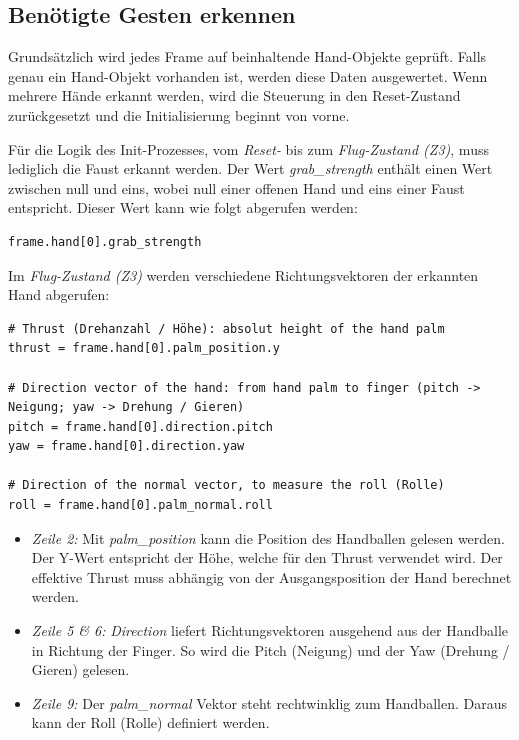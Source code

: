 \subsection{Benötigte Gesten erkennen}
Grundsätzlich wird jedes Frame auf beinhaltende Hand-Objekte geprüft.
Falls genau ein Hand-Objekt vorhanden ist, werden diese Daten ausgewertet. Wenn mehrere Hände erkannt werden, wird die Steuerung in den Reset-Zustand zurückgesetzt und die Initialisierung beginnt von vorne.

Für die Logik des Init-Prozesses, vom \textit{Reset-} bis zum \textit{Flug-Zustand (Z3)}, muss lediglich die Faust erkannt werden.
Der Wert \textit{grab\_strength} enthält einen Wert zwischen null und eins, wobei null einer offenen Hand und eins einer Faust entspricht.
Dieser Wert kann wie folgt abgerufen werden:

\begin{lstlisting}[style=lstStyleCpp]
frame.hand[0].grab_strength
\end{lstlisting}

Im \textit{Flug-Zustand (Z3)} werden verschiedene Richtungsvektoren der erkannten Hand abgerufen:

\begin{lstlisting}[style=lstStyleCpp]
# Thrust (Drehanzahl / Höhe): absolut height of the hand palm
thrust = frame.hand[0].palm_position.y

# Direction vector of the hand: from hand palm to finger (pitch -> Neigung; yaw -> Drehung / Gieren)
pitch = frame.hand[0].direction.pitch
yaw = frame.hand[0].direction.yaw

# Direction of the normal vector, to measure the roll (Rolle)
roll = frame.hand[0].palm_normal.roll
\end{lstlisting}

\begin{itemize}
	\item \textit{Zeile 2:}
	Mit \textit{palm\_position} kann die Position des Handballen gelesen werden.
	Der Y-Wert entspricht der Höhe, welche für den Thrust verwendet wird.
	Der effektive Thrust muss abhängig von der Ausgangsposition der Hand berechnet werden.

	\item \textit{Zeile 5 \& 6:}
	\textit{Direction} liefert Richtungsvektoren ausgehend aus der Handballe in Richtung der Finger. So wird die Pitch (Neigung) und der Yaw (Drehung / Gieren) gelesen.

	\item \textit{Zeile 9:}
	Der \textit{palm\_normal} Vektor steht rechtwinklig zum Handballen. Daraus kann der Roll (Rolle) definiert werden.
\end{itemize}

